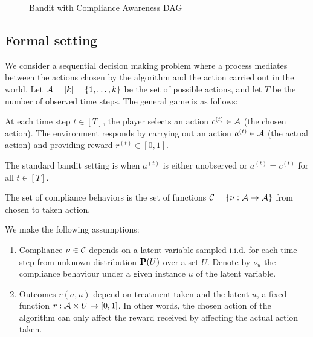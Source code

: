\begin{figure*}[t]
	\centering	
	
	\caption{Bandit with Compliance Awareness DAG}
\end{figure*}


\subsection{Formal setting}
\label{sec:formal}

We consider a sequential decision making problem where a process mediates between the actions chosen by the algorithm and the action carried out in the world. Let ${\mathcal A}=[k]=\{1,\ldots,k\}$ be the set of possible actions, and let $T$ be the number of observed time steps. The general game is as follows:

\begin{defn}\label{def:compliance_bandit}\eod
	At each time step $t\in[T]$, the player selects an action $c^{(t)}\in {\mathcal A}$ (the chosen action). The environment responds by carrying out an action $a^{(t)}\in{\mathcal A}$ (the actual action) and providing reward $r^{(t)}\in[0,1]$.
\end{defn}
The standard bandit setting is when $a^{(t)}$ is either unobserved or $a^{(t)}=c^{(t)}$ for all $t\in[T]$.


The set of compliance behaviors is the set of functions ${\mathcal C}=\{\nu:{\mathcal A}\rightarrow{\mathcal A}\}$ from chosen to taken action.%

\begin{defn}\label{def:assumptions}\eod
	We make the following assumptions:
	\begin{enumerate}
		\item Compliance $\nu \in{\mathcal C}$ depends on a latent variable sampled i.i.d. for each time step from unknown distribution ${\mathbf P}(U)$ over a set $U$. Denote by $\nu_u$ the compliance behaviour under a given instance $u$ of the latent variable. 
		\item Outcomes $r(a,u)$ depend on treatment taken and the latent $u$, a fixed function $r: {\mathcal A}\times U\rightarrow[0,1]$. In other words, the chosen action of the algorithm can only affect the reward received by affecting the actual action taken. 
	\end{enumerate}
\end{defn}


